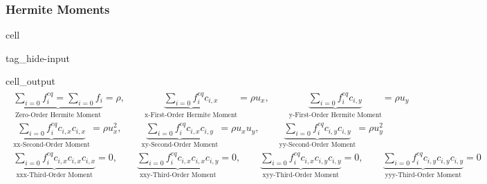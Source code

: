 \documentclass[letterpaper,10pt,english,openany,oneside]{jupyterBook}
\begin{document}
\subsubsection{Hermite Moments}
\label{\detokenize{Refs/LBM-Study/intro-nse-lbm/Navier-Stokes-Equation:hermite-moments}}
\begin{sphinxuseclass}{cell}
\begin{sphinxuseclass}{tag_hide-input}\begin{sphinxVerbatimOutput}

\begin{sphinxuseclass}{cell_output}\begin{equation*}
\begin{split}\displaystyle \begin{gathered}\underbrace{\sum_{i=0} f_{i}^{eq} =\sum_{i=0} f_{i} }_{\textrm{Zero-Order Hermite Moment}} =\rho,\quad \quad \underbrace{\sum_{i=0} f_{i}^{eq}c_{i,x} }_{\textrm{x-First-Order Hermite Moment}} =\rho u_{x},\quad \quad \underbrace{\sum_{i=0} f_{i}^{eq}c_{i,y} }_{\textrm{y-First-Order Hermite Moment}} =\rho u_{y}\\[10pt]\underbrace{\sum_{i=0} f_{i}^{eq} c_{i,x}c_{i,x} }_{\textrm{xx-Second-Order Moment}} =\rho u_{x}^{2},\quad \quad \underbrace{\sum_{i=0} f_{i}^{eq} c_{i,x}c_{i,y} }_{\textrm{xy-Second-Order Moment}} =\rho u_{x} u_{y},\quad \quad \underbrace{\sum_{i=0} f_{i}^{eq} c_{i,y}c_{i,y} }_{\textrm{yy-Second-Order Moment}} =\rho u_{y}^{2}\\[10pt]\underbrace{\sum_{i=0} f_{i}^{eq} c_{i,x}c_{i,x}c_{i,x} }_{\textrm{xxx-Third-Order Moment}} =0,\quad \quad \underbrace{\sum_{i=0} f_{i}^{eq} c_{i,x}c_{i,x}c_{i,y} }_{\textrm{xxy-Third-Order Moment}} =0,\quad \quad \underbrace{\sum_{i=0} f_{i}^{eq} c_{i,x}c_{i,y}c_{i,y} }_{\textrm{xyy-Third-Order Moment}} =0,\quad \quad \underbrace{\sum_{i=0} f_{i}^{eq} c_{i,y}c_{i,y}c_{i,y} }_{\textrm{yyy-Third-Order Moment}} =0\end{gathered}\end{split}
\end{equation*}
\end{sphinxuseclass}\end{sphinxVerbatimOutput}

\end{sphinxuseclass}
\end{sphinxuseclass}
\end{document}
